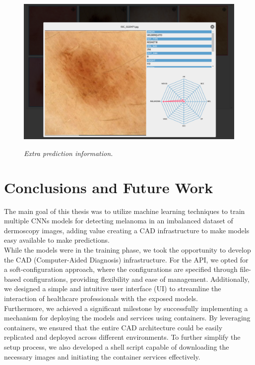 \begin{figure}[H]
  \centering
  \begin{adjustbox}{width=0.9\textwidth, trim={0.05cm 0cm 0.25cm 0cm}, clip}
    \includegraphics[]{imatges/results/extra-inf-popup.png}
  \end{adjustbox}
  \caption[Extra prediction information]{\textit{Extra prediction information.}}
  {\label{fig:extra-inf-popup}}
\end{figure}


\section{Conclusions and Future Work}
\label{cap:concl}

The main goal of this thesis was to utilize machine learning techniques to
train multiple CNNs models for detecting melanoma in an imbalanced dataset of
dermoscopy images, adding value creating a CAD infrastructure to make models easy
available to make predictions. \\

While the models were in the training phase, we took the opportunity to develop
the CAD (Computer-Aided Diagnosis) infrastructure. For the API, we opted for a
soft-configuration approach, where the configurations are specified through
file-based configurations, providing flexibility and ease of management.
Additionally, we designed a simple and intuitive user interface (UI) to
streamline the interaction of healthcare professionals with the exposed models.
\\

Furthermore, we achieved a significant milestone by successfully implementing a
mechanism for deploying the models and services using containers. By leveraging
containers, we ensured that the entire CAD architecture could be easily
replicated and deployed across different environments. To further simplify the
setup process, we also developed a shell script capable of downloading the
necessary images and initiating the container services effectively. \\

